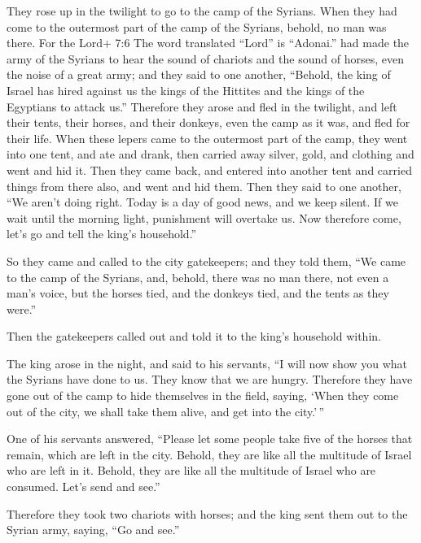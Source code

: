  They rose up in the twilight to go to the camp of the
Syrians. When they had come to the outermost part of the camp of the
Syrians, behold, no man was there.  For the Lord+ 7:6 The
word translated ``Lord'' is ``Adonai.'' had made the army of the Syrians
to hear the sound of chariots and the sound of horses, even the noise of
a great army; and they said to one another, ``Behold, the king of Israel
has hired against us the kings of the Hittites and the kings of the
Egyptians to attack us.''  Therefore they arose and fled in
the twilight, and left their tents, their horses, and their donkeys,
even the camp as it was, and fled for their life.  When
these lepers came to the outermost part of the camp, they went into one
tent, and ate and drank, then carried away silver, gold, and clothing
and went and hid it. Then they came back, and entered into another tent
and carried things from there also, and went and hid them. 
Then they said to one another, ``We aren't doing right. Today is a day
of good news, and we keep silent. If we wait until the morning light,
punishment will overtake us. Now therefore come, let's go and tell the
king's household.''

 So they came and called to the city gatekeepers; and they
told them, ``We came to the camp of the Syrians, and, behold, there was
no man there, not even a man's voice, but the horses tied, and the
donkeys tied, and the tents as they were.''

 Then the gatekeepers called out and told it to the king's
household within.

 The king arose in the night, and said to his servants, ``I
will now show you what the Syrians have done to us. They know that we
are hungry. Therefore they have gone out of the camp to hide themselves
in the field, saying, `When they come out of the city, we shall take
them alive, and get into the city.'\,''

 One of his servants answered, ``Please let some people
take five of the horses that remain, which are left in the city. Behold,
they are like all the multitude of Israel who are left in it. Behold,
they are like all the multitude of Israel who are consumed. Let's send
and see.''

 Therefore they took two chariots with horses; and the king
sent them out to the Syrian army, saying, ``Go and see.''

